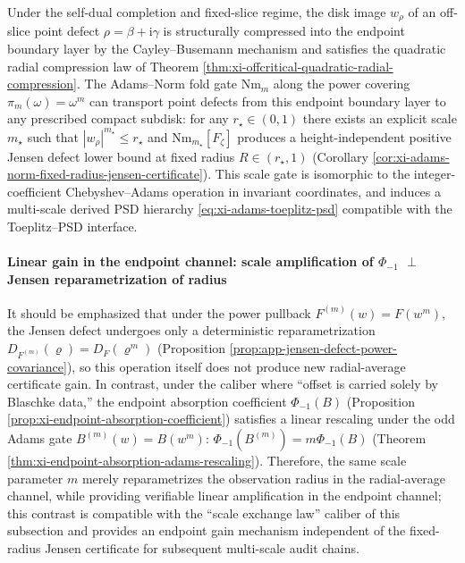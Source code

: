 \begin{theorem}\label{thm:xi-symmetry-audit-tension-scaled}
Under the self-dual completion and fixed-slice regime, the disk image \(w_\rho\) of an off-slice point defect \(\rho=\beta+\mathrm{i}\gamma\) is structurally compressed into the endpoint boundary layer by the Cayley--Busemann mechanism and satisfies the quadratic radial compression law of Theorem \ref{thm:xi-offcritical-quadratic-radial-compression}.
The Adams--Norm fold gate \(\mathrm{Nm}_m\) along the power covering \(\pi_m(\omega)=\omega^m\) can transport point defects from this endpoint boundary layer to any prescribed compact subdisk: for any \(r_\star\in(0,1)\) there exists an explicit scale \(m_\star\) such that \(|w_\rho|^{m_\star}\le r_\star\) and \(\mathrm{Nm}_{m_\star}[F_\zeta]\) produces a height-independent positive Jensen defect lower bound at fixed radius \(R\in(r_\star,1)\) (Corollary \ref{cor:xi-adams-norm-fixed-radius-jensen-certificate}).
This scale gate is isomorphic to the integer-coefficient Chebyshev--Adams operation in invariant coordinates, and induces a multi-scale derived PSD hierarchy \eqref{eq:xi-adams-toeplitz-psd} compatible with the Toeplitz--PSD interface.
\end{theorem}

\paragraph{Linear gain in the endpoint channel: scale amplification of \texorpdfstring{$\Phi_{-1}$}{Phi-1} \texorpdfstring{$\perp$}{orthogonal to} Jensen reparametrization of radius}
It should be emphasized that under the power pullback \(F^{(m)}(w)=F(w^m)\), the Jensen defect undergoes only a deterministic reparametrization
\(
D_{F^{(m)}}(\varrho)=D_F(\varrho^m)
\)
(Proposition \ref{prop:app-jensen-defect-power-covariance}), so this operation itself does not produce new radial-average certificate gain.
In contrast, under the caliber where ``offset is carried solely by Blaschke data,'' the endpoint absorption coefficient \(\Phi_{-1}(B)\) (Proposition \ref{prop:xi-endpoint-absorption-coefficient}) satisfies a linear rescaling under the odd Adams gate
\(
B^{(m)}(w)=B(w^m)
\):
\(
\Phi_{-1}(B^{(m)})=m\Phi_{-1}(B)
\)
(Theorem \ref{thm:xi-endpoint-absorption-adams-rescaling}).
Therefore, the same scale parameter \(m\) merely reparametrizes the observation radius in the radial-average channel, while providing verifiable linear amplification in the endpoint channel; this contrast is compatible with the ``scale exchange law'' caliber of this subsection and provides an endpoint gain mechanism independent of the fixed-radius Jensen certificate for subsequent multi-scale audit chains.

\endinput
